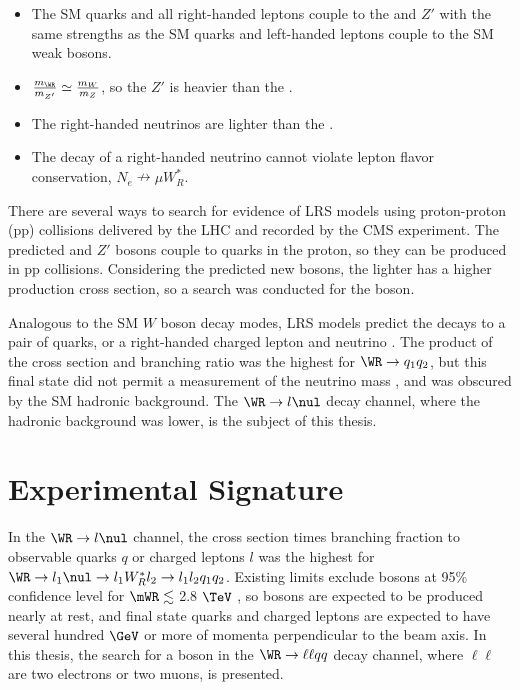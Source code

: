 \begin{itemize}
	\item The SM quarks and all right-handed leptons couple to the \WR and $Z'$ with the same strengths 
		as the SM quarks and left-handed leptons couple to the SM weak bosons.
	\item $\frac{m_{\WR}}{m_{Z'}} \simeq \frac{m_{W}}{m_{Z}}$, so the $Z'$ is heavier than the \WR.
	\item The right-handed neutrinos \nul are lighter than the \WR.
	\item The decay of a right-handed neutrino cannot violate lepton flavor conservation, $N_{e} \nrightarrow \mu W^{*}_{R}$.
\end{itemize}

There are several ways to search for evidence of LRS models using proton-proton (pp) collisions delivered 
by the LHC and recorded by the CMS experiment.  The predicted \WR and $Z'$ bosons couple to quarks in the 
proton, so they can be produced in pp collisions.  Considering the predicted new bosons, the lighter \WR 
has a higher production cross section, so a search was conducted for the \WR boson.

Analogous to the SM $W$ boson decay modes, LRS models predict the \WR decays to a pair of quarks, or a 
right-handed charged lepton and neutrino \nul.  The product of the cross section and branching ratio 
was the highest for $\WR \rightarrow q_{1}q_{2}$, but this final state did not permit a measurement of 
the neutrino mass \mnul, and was obscured by the SM hadronic background.  The $\WR \rightarrow l\nul$ 
decay channel, where the hadronic background was lower, is the subject of this thesis.

\section{Experimental Signature}
\label{sec:lrsExpSignature}
In the $\WR \rightarrow l\nul$ channel, the cross section times branching fraction to observable quarks 
$q$ or charged leptons $l$ was the highest for $\WR \rightarrow l_{1}\nul \rightarrow l_{1}W^{*}_{R}l_{2} \rightarrow l_{1}l_{2}q_{1}q_{2}$.  
Existing limits exclude \WR bosons at 95\% confidence level for $\mWR \lesssim$ 2.8 $\TeV$ \cite{cmsWRRunOneResults}, 
so \WR bosons are expected to be produced nearly at rest, and final state quarks and charged leptons are 
expected to have several hundred $\GeV$ or more of momenta perpendicular to the beam axis.  In this 
thesis, the search for a \WR boson in the $\WR \rightarrow \ell\ell qq$ decay channel, where $\ell\ell$ 
are two electrons or two muons, is presented.

